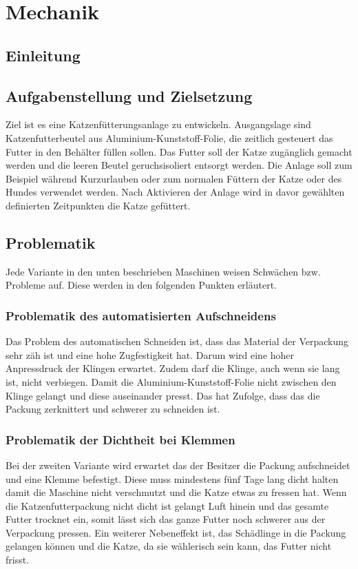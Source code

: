 \chapter{Mechanik}
\section{Einleitung}
\section{Aufgabenstellung und Zielsetzung}

Ziel ist es eine Katzenfütterungsanlage zu entwickeln. Ausgangslage sind Katzenfutterbeutel aus Aluminium-Kunststoff-Folie, die zeitlich gesteuert das Futter in den Behälter füllen sollen. Das Futter soll der Katze zugänglich gemacht werden und die leeren Beutel geruchsisoliert entsorgt werden. Die Anlage soll zum Beispiel während Kurzurlauben oder zum normalen Füttern der Katze oder des Hundes verwendet werden. Nach Aktivieren der Anlage wird in davor gewählten definierten Zeitpunkten die Katze gefüttert. 


\section{Problematik}

Jede Variante in den unten beschrieben Maschinen weisen Schwächen bzw. Probleme auf. Diese werden in den folgenden Punkten erläutert.

\subsection{Problematik des automatisierten Aufschneidens}

Das Problem des automatischen Schneiden ist, dass das Material der Verpackung sehr zäh ist und eine hohe Zugfestigkeit hat. Darum wird eine hoher Anpressdruck der Klingen erwartet. Zudem darf die Klinge, auch wenn sie lang ist, nicht verbiegen. Damit die Aluminium-Kunststoff-Folie nicht zwischen den Klinge gelangt und diese auseinander presst. Das hat Zufolge, dass das die Packung zerknittert und schwerer zu schneiden ist. 

\subsection{Problematik der Dichtheit bei Klemmen}

Bei der zweiten Variante wird erwartet das der Besitzer die Packung aufschneidet und eine Klemme befestigt. Diese muss mindestens fünf Tage lang dicht halten damit die Maschine nicht verschmutzt und die Katze etwas zu fressen hat. Wenn die Katzenfutterpackung nicht dicht ist gelangt Luft hinein und das gesamte Futter trocknet ein, somit lässt sich das ganze Futter noch schwerer aus der Verpackung pressen. Ein weiterer Nebeneffekt ist, das Schädlinge in die Packung gelangen können und die Katze, da sie wählerisch sein kann, das Futter nicht frisst.

